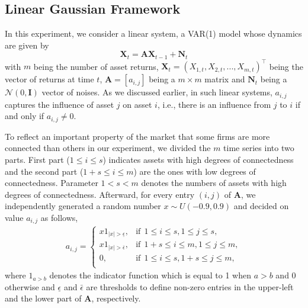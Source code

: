  \subsection{Linear Gaussian Framework} \label{linfr}
 In this experiment, we consider a linear system, a VAR(1) model whose dynamics are given by 
\begin{equation}\label{eq:ex_lin}
    \textbf{X}_t = \textbf{A} \textbf{X}_{t-1} + \textbf{N}_t
\end{equation}
with $m$ being the number of asset returns, $\textbf{X}_t = (X_{1,t}, X_{2,t}, ... , X_{m,t})^\top$ being the vector of returns at time $t$, $\textbf{A}=[a_{i,j}]$ being a $m\times m$ matrix and $\textbf{N}_t$ being a $\mathcal{N}(0,\textbf{I})$ vector of noises. 
As we discussed earlier, in such linear systems, $a_{i,j}$ captures the influence of asset $j$ on asset $i$, i.e., there is an influence from $j$ to $i$ if and only if $a_{i,j}\neq0$.



To reflect an important property of the market that some firms are more connected than others in our experiment, we divided the $m$ time series into two parts. 
First part ($1\leq i\leq s$) indicates assets with high degrees of connectedness and the second part ($1+s\leq i\leq m$) are the ones with low degrees of connectedness.
Parameter $1<s<m$ denotes the numbers of assets with high degrees of connectedness.
Afterward, for every entry $(i,j)$ of $\textbf{A}$, we independently generated a random number $x\sim U(-0.9, 0.9)$ and decided on value $a_{i,j}$ as follows,
\begin{align}\label{eq:rules}
    a_{i,j}=\left\{
\begin{array}{ll}
      x 1_{|x| > \underline{\epsilon} },  & \text{if}\ \ 1\leq i\leq s, 1\leq j\leq s, \\
      x 1_{|x| > \overline{\epsilon} },  & \text{if}\ \ 1+s\leq i\leq m, 1\leq j\leq m, \\
      0,  & \text{if}\ \ 1\leq i\leq s, 1+s\leq j\leq m, \\
\end{array} 
\right.
\end{align}
where $1_{a>b}$ denotes the indicator function which is equal to 1 when $a>b$ and $0$ otherwise and $\underline{\epsilon}$ and $\bar{\epsilon}$ are thresholds to define non-zero entries in the upper-left and the lower part of $\textbf{A}$, respectively.

